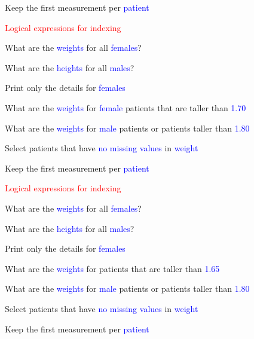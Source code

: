 \documentclass{presentatiesmetlogo}
\begin{document}
\item Keep the first measurement per \textcolor{blue}{patient}
\eitemt
\eitem
\bitem
\item \textcolor{red}{Logical expressions for indexing}
\bitemt
\item What are the \textcolor{blue}{weights} for all \textcolor{blue}{females}?
\item What are the \textcolor{blue}{heights} for all \textcolor{blue}{males}?
\item Print only the details for \textcolor{blue}{females}
\item {}
\item What are the \textcolor{blue}{weights} for \textcolor{blue}{female} patients that are taller than \textcolor{blue}{1.70}
\item What are the \textcolor{blue}{weights} for \textcolor{blue}{male} patients or patients taller than \textcolor{blue}{1.80}
\item Select patients that have \textcolor{blue}{no missing values} in \textcolor{blue}{weight}
\item Keep the first measurement per \textcolor{blue}{patient}
\eitemt
\eitem
\bitem
\item \textcolor{red}{Logical expressions for indexing}
\bitemt
\item What are the \textcolor{blue}{weights} for all \textcolor{blue}{females}?
\item What are the \textcolor{blue}{heights} for all \textcolor{blue}{males}?
\item Print only the details for \textcolor{blue}{females}
\item What are the \textcolor{blue}{weights} for patients that are taller than \textcolor{blue}{1.65}
\item {}
\item What are the \textcolor{blue}{weights} for \textcolor{blue}{male} patients or patients taller than \textcolor{blue}{1.80}
\item Select patients that have \textcolor{blue}{no missing values} in \textcolor{blue}{weight}
\item Keep the first measurement per \textcolor{blue}{patient}
\end{document}
